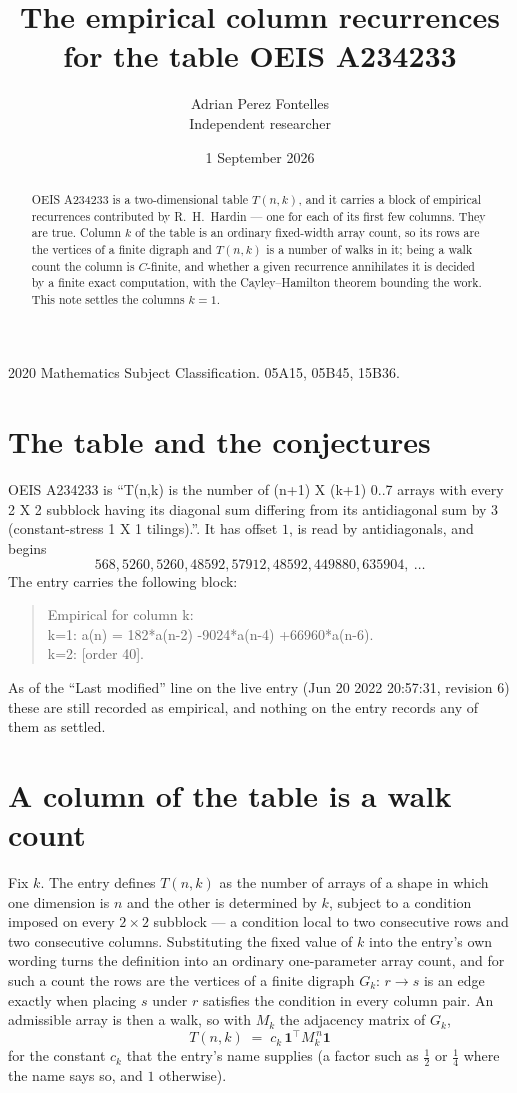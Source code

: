 \documentclass[11pt,a4paper]{article}
\title{The empirical column recurrences for the table OEIS A234233}
\author{Adrian Perez Fontelles\\ \small Independent researcher}
\date{1 September 2026}
\theoremstyle{plain}
\theoremstyle{definition}
\begin{document}
\maketitle

\begin{abstract}
OEIS A234233 is a two-dimensional table $T(n,k)$, and it carries a block of empirical
recurrences contributed by R.~H.~Hardin --- one for each of its first few columns. They are
true. Column $k$ of the table is an ordinary fixed-width array count, so its rows are the
vertices of a finite digraph and $T(n,k)$ is a number of walks in it; being a walk count the
column is $C$-finite, and whether a given recurrence annihilates it is decided by a finite
exact computation, with the Cayley--Hamilton theorem bounding the work. This note settles the
columns $k=1$.
\end{abstract}

\noindent\small 2020 Mathematics Subject Classification. 05A15, 05B45, 15B36.\normalsize

\section{The table and the conjectures}

OEIS A234233 is ``T(n,k) is the number of (n+1) X (k+1) 0..7 arrays with every 2 X 2 subblock having its diagonal sum differing from its antidiagonal sum by 3 (constant-stress 1 X 1 tilings).''. It has offset $1$, is
read by antidiagonals, and begins
\[
568, 5260, 5260, 48592, 57912, 48592, 449880, 635904,\ \dots
\]
The entry carries the following block:
\begin{quote}\small
Empirical for column k:\\
k=1: a(n) = 182*a(n-2) -9024*a(n-4) +66960*a(n-6).\\
k=2: [order 40].\\
\end{quote}
As of the ``Last modified'' line on the live entry (Jun 20 2022 20:57:31, revision 6) these are still
recorded as empirical, and nothing on the entry records any of them as settled.

\section{A column of the table is a walk count}

Fix $k$. The entry defines $T(n,k)$ as the number of arrays of a shape in which one dimension
is $n$ and the other is determined by $k$, subject to a condition imposed on every
$2\times2$ subblock --- a condition local to two consecutive rows and two consecutive columns.
Substituting the fixed value of $k$ into the entry's own wording turns the definition into an
ordinary one-parameter array count, and for such a count the rows are the vertices of a finite
digraph $G_k$: $r\to s$ is an edge exactly when placing $s$ under $r$ satisfies the condition
in every column pair. An admissible array is then a walk, so with $M_k$ the adjacency matrix
of $G_k$,
\[
T(n,k)\;=\;c_k\,\mathbf{1}^{\!\top}M_k^{\,n}\mathbf{1}
\]
for the constant $c_k$ that the entry's name supplies (a factor such as $\tfrac12$ or
$\tfrac14$ where the name says so, and $1$ otherwise).
\end{document}
